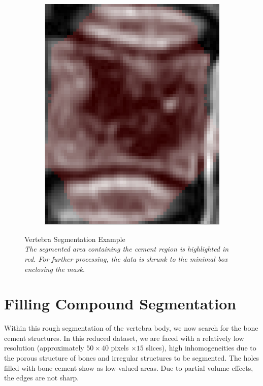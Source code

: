 \documentclass{article}
\begin{document}
{\begin{figure}[h]
\begin{subfigure}[t]{0.45\linewidth}
      \end{subfigure}
      \hfill
      \begin{subfigure}[t]{0.45\linewidth}
        \centering
        \includegraphics[scale=0.4]{VertebraSegmentationExample_2.png}
      \end{subfigure}
      \caption{Vertebra Segmentation Example\\
        \textit{The segmented area containing the cement region is highlighted in red. For further processing, the data is shrunk to the minimal box enclosing the mask.}}
    \end{figure} 
  }	
  
  \pagebreak
  \section{Filling Compound Segmentation}
  
  Within this rough segmentation of the vertebra body, we now search for the bone cement structures.
  In this reduced dataset, we are faced with a relatively low resolution (approximately $50 \times 40$ pixels $\times 15$ slices), high inhomogeneities due to the porous structure of bones and irregular structures to be segmented.
  The holes filled with bone cement show as low-valued areas.
  Due to partial volume effects, the edges are not sharp. 
  
\end{document}
